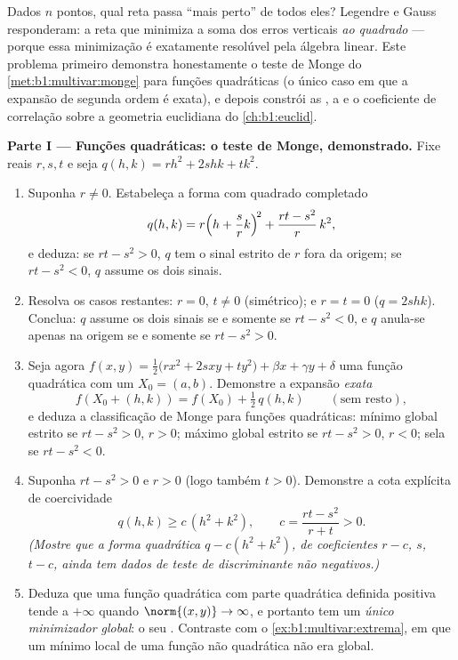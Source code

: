 \begin{problem}\label{pb:b1:multivar:1}
Dados $n$ pontos, qual reta passa ``mais perto'' de todos eles?
Legendre e Gauss responderam: a reta que minimiza a soma dos erros
verticais \emph{ao quadrado} --- porque essa minimização é exatamente
resolúvel pela álgebra linear. Este problema primeiro demonstra
honestamente o teste de Monge do \cref{met:b1:multivar:monge} para funções quadráticas (o
único caso em que a expansão de segunda ordem é exata), e depois
constrói as , a  e o coeficiente de
correlação sobre a geometria euclidiana do
\cref{ch:b1:euclid}.

\medskip
\noindent\textbf{Parte I --- Funções quadráticas: o teste de Monge,
demonstrado.} Fixe reais $r, s, t$ e seja $q(h, k) = r h^2 + 2s hk +
t k^2$.
\begin{enumerate}
  \item Suponha $r \neq 0$. Estabeleça a forma com quadrado completado
        \[
        q(h, k) = r\Bigl(h + \frac{s}{r}k\Bigr)^{\!2}
        + \frac{rt - s^2}{r}\,k^2 ,
        \]
        e deduza: se $rt - s^2 > 0$, $q$ tem o sinal estrito de $r$ fora da
        origem; se $rt - s^2 < 0$, $q$ assume os dois sinais.
  \item Resolva os casos restantes: $r = 0$, $t \neq 0$ (simétrico); e
        $r = t = 0$ ($q = 2shk$). Conclua: $q$ assume os dois sinais se e
        somente se $rt - s^2 < 0$, e $q$ anula-se apenas na origem se e
        somente se $rt - s^2 > 0$.
  \item Seja agora $f(x, y) = \frac12\bigl(r x^2 + 2s xy + t
        y^2\bigr) + \beta x + \gamma y + \delta$ uma função quadrática com um 
        $X_0 = (a, b)$. Demonstre a expansão \emph{exata}
        \[
        f(X_0 + (h,k)) = f(X_0) + \tfrac12\,q(h, k)
        \qquad (\text{sem resto}),
        \]
        e deduza a classificação de Monge para funções quadráticas:
        mínimo global estrito se $rt - s^2 > 0$, $r >
        0$; máximo global estrito
        se $rt - s^2 > 0$, $r < 0$; sela se $rt - s^2 < 0$.
  \item Suponha $rt - s^2 > 0$ e $r > 0$ (logo também $t > 0$). Demonstre a
        cota explícita de coercividade
        \[
        q(h, k) \geq c\,(h^2 + k^2),
        \qquad
        c = \frac{rt - s^2}{r + t} > 0 .
        \]
        \emph{(Mostre que a forma quadrática $q - c(h^2 + k^2)$, de coeficientes
        $r - c$, $s$, $t - c$, ainda tem dados de teste de
        discriminante não negativos.)}
  \item Deduza que uma função quadrática com parte quadrática
        definida positiva tende a $+\infty$ quando $\norm{(x,y)} \to
        \infty$, e portanto
        tem um \emph{único minimizador global}: o seu .
        Contraste com o \cref{ex:b1:multivar:extrema}, em que um mínimo local de uma função
        não quadrática não era global.
\end{enumerate}


\end{problem}
